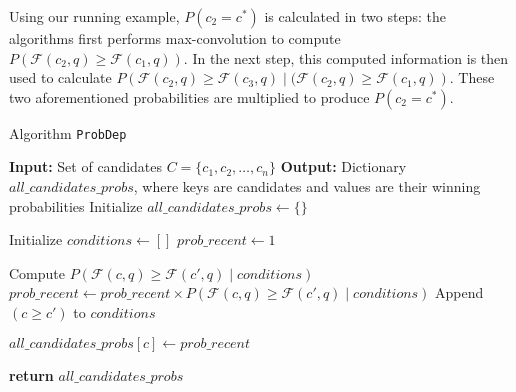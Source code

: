 Using our running example, $P(c_2 = c^*)$ is calculated in two steps: the algorithms first performs max-convolution to compute $P\left(\mathcal{F}(c_2, q) \geq \mathcal{F}(c_1, q)\right)$. In the next step, this computed information is then used to calculate $P\left(\mathcal{F}(c_2, q) \geq \mathcal{F}(c_3, q) \mid ( \mathcal{F}(c_2, q) \geq \mathcal{F}(c_1, q) \right)$. These two aforementioned probabilities are multiplied to produce $P(c_2 = c^*)$. 

\begin{algorithm} \label{compute_pdf_code}
\caption{Algorithm {\tt ProbDep}}\label{alg:dep}
\begin{algorithmic}[1]
    \State \textbf{Input:} Set of candidates $C = \{c_1, c_2, \dots, c_n\}$
    \State \textbf{Output:} Dictionary $all\_candidates\_probs$, where keys are candidates and values are their winning probabilities
    \State Initialize $all\_candidates\_probs \gets \{\}$
    
        \State Initialize $conditions \gets []$
        \State $prob\_recent \gets 1$
        
            \State Compute $P(\mathcal{F}(c, q) \geq \mathcal{F}(c', q) \mid conditions)$
            \State $prob\_recent \gets prob\_recent \times P(\mathcal{F}(c, q) \geq \mathcal{F}(c', q) \mid conditions)$
            \State Append $(c \geq c')$ to $conditions$
        \EndFor
        
        \State $all\_candidates\_probs[c] \gets prob\_recent$
    \EndFor
    
    \State \textbf{return} $all\_candidates\_probs$
\end{algorithmic}
\end{algorithm}

